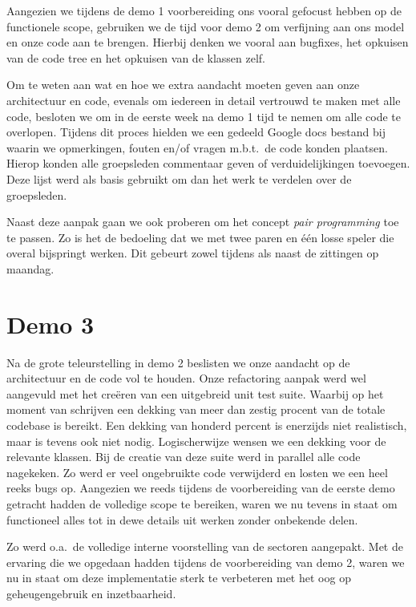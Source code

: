 \documentclass[12pt,a4paper]{report}
\begin{document}
Aangezien we tijdens de demo 1 voorbereiding ons vooral gefocust hebben op de functionele scope, gebruiken we de tijd voor demo 2 om verfijning aan ons model en onze code aan te brengen. Hierbij denken we vooral aan bugfixes, het opkuisen van de code tree en het opkuisen van de klassen zelf.

Om te weten aan wat en hoe we extra aandacht moeten geven aan onze architectuur en code, evenals om iedereen in detail vertrouwd te maken met alle code, besloten we om in de eerste week na demo 1 tijd te nemen om alle code te overlopen. Tijdens dit proces hielden we een gedeeld Google docs bestand bij waarin we opmerkingen, fouten en/of vragen m.b.t.\ de code konden plaatsen. Hierop konden alle groepsleden commentaar geven of verduidelijkingen toevoegen. Deze lijst werd als basis gebruikt om dan het werk te verdelen over de groepsleden.

Naast deze aanpak gaan we ook proberen om het concept \emph{pair programming} toe te passen. Zo is het de bedoeling dat we met twee paren en \'e\'en losse speler die overal bijspringt werken. Dit gebeurt zowel tijdens als naast de zittingen op maandag.

\section{Demo 3}

Na de grote teleurstelling in demo 2 beslisten we onze aandacht op de architectuur en de code vol te houden. Onze refactoring aanpak werd wel aangevuld met het cre\"eren van een uitgebreid unit test suite. Waarbij op het moment van schrijven een dekking van meer dan zestig procent van de totale codebase is bereikt. Een dekking van honderd percent is enerzijds niet realistisch, maar is tevens ook niet nodig. Logischerwijze wensen we een dekking voor de relevante klassen. Bij de creatie van deze suite werd in parallel alle code nagekeken. Zo werd er veel ongebruikte code verwijderd en losten we een heel reeks bugs op. Aangezien we reeds tijdens de voorbereiding van de eerste demo getracht hadden de volledige scope te bereiken, waren we nu tevens in staat om functioneel alles tot in dewe  details uit werken zonder onbekende delen.

Zo werd o.a.\ de volledige interne voorstelling van de sectoren aangepakt. Met de ervaring die we opgedaan hadden tijdens de voorbereiding van demo 2, waren we nu in staat om deze implementatie sterk te verbeteren met het oog op geheugengebruik en inzetbaarheid.
\end{document}
